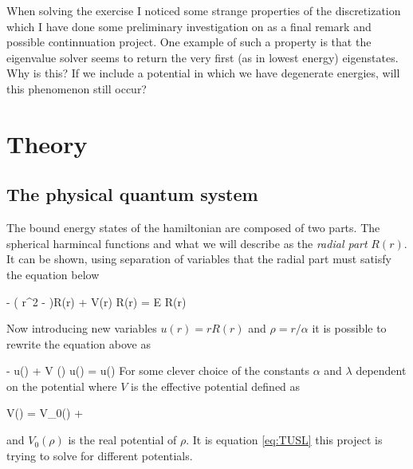 \documentclass[a4paper,10pt,english]{article}
\numberwithin{figure}{subsection}
\numberwithin{table}{subsection}
\numberwithin{equation}{subsection}
\begin{document}
When solving the exercise I noticed some strange properties of the discretization
which I have done some preliminary investigation on as a final remark 
and possible continnuation project. 
One example of such a property is that the eigenvalue solver seems to return 
the very first (as in lowest energy) eigenstates. 
Why is this? 
If we include a potential in which we have degenerate energies, will this phenomenon still occur?




























\section{Theory}\label{sec:theory}

\subsection{The physical quantum system}\label{sec:systems}

The bound energy states of the hamiltonian are composed of two parts. 
The spherical harmincal functions and what we will describe as the \textit{radial part} $R(r)$. 
It can be shown, using separation of variables that the radial part must satisfy the equation below

\eqs - \left (   r^2
   -  \right )R(r) 
     + V(r) R(r) = E R(r) \eqf

Now introducing new variables $u(r) = r R(r)$ and $\rho = r/\alpha$ it 
is possible to rewrite the equation above as 

\eqs 
 - u(\rho) + V (\rho)
 u(\rho)  = \lambda u(\rho)
 \eqf 
For some clever choice of the constants $\alpha$ and $\lambda$ dependent on the 
potential
where $V$ is the effective potential defined as 

\eqs V(\rho) = V_0(\rho) +  \label{eq:TUSL} \eqf

and $V_0(\rho)$ is the real potential of $\rho$.
It is equation \ref{eq:TUSL} this project is trying to solve for different potentials.
\end{document}
